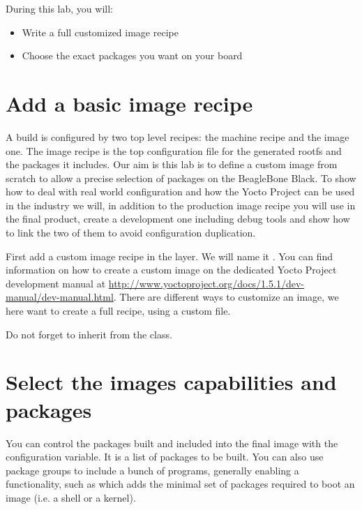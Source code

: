 
During this lab, you will:
\begin{itemize}
  \item Write a full customized image recipe
  \item Choose the exact packages you want on your board
\end{itemize}

\section{Add a basic image recipe}

A build is configured by two top level recipes: the machine recipe and the image
one. The image recipe is the top configuration file for the generated rootfs and
the packages it includes. Our aim is this lab is to define a custom image from
scratch to allow a precise selection of packages on the BeagleBone Black. To
show how to deal with real world configuration and how the Yocto Project can be
used in the industry we will, in addition to the production image recipe you
will use in the final product, create a development one including debug tools
and show how to link the two of them to avoid configuration duplication.

First add a custom image recipe in the  layer. We will name it
. You can find information on how to create a custom
image on the dedicated Yocto Project development manual at
\url{http://www.yoctoproject.org/docs/1.5.1/dev-manual/dev-manual.html}. There
are different ways to customize an image, we here want to create a full recipe,
using a custom  file.

Do not forget to inherit from the  class.

\section{Select the images capabilities and packages}

You can control the packages built and included into the final image with the
 configuration variable. It is a list of packages to be
built. You can also use package groups to include a bunch of programs, generally
enabling a functionality, such as  which adds the
minimal set of packages required to boot an image (i.e. a shell or a kernel).

